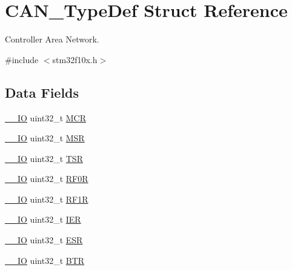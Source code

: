 \hypertarget{struct_c_a_n___type_def}{}\section{C\+A\+N\+\_\+\+Type\+Def Struct Reference}
\label{struct_c_a_n___type_def}


Controller Area Network.  




{\ttfamily \#include $<$stm32f10x.\+h$>$}

\subsection*{Data Fields}
\begin{DoxyCompactItemize}
\item 
\mbox{\hyperlink{core__sc300_8h_aec43007d9998a0a0e01faede4133d6be}{\+\_\+\+\_\+\+IO}} uint32\+\_\+t \mbox{\hyperlink{struct_c_a_n___type_def_a27af4e9f888f0b7b1e8da7e002d98798}{M\+CR}}
\item 
\mbox{\hyperlink{core__sc300_8h_aec43007d9998a0a0e01faede4133d6be}{\+\_\+\+\_\+\+IO}} uint32\+\_\+t \mbox{\hyperlink{struct_c_a_n___type_def_acdd4c1b5466be103fb2bb2a225b1d3a9}{M\+SR}}
\item 
\mbox{\hyperlink{core__sc300_8h_aec43007d9998a0a0e01faede4133d6be}{\+\_\+\+\_\+\+IO}} uint32\+\_\+t \mbox{\hyperlink{struct_c_a_n___type_def_a87e3001757a0cd493785f1f3337dd0e8}{T\+SR}}
\item 
\mbox{\hyperlink{core__sc300_8h_aec43007d9998a0a0e01faede4133d6be}{\+\_\+\+\_\+\+IO}} uint32\+\_\+t \mbox{\hyperlink{struct_c_a_n___type_def_accf4141cee239380d0ad4634ee21dbf6}{R\+F0R}}
\item 
\mbox{\hyperlink{core__sc300_8h_aec43007d9998a0a0e01faede4133d6be}{\+\_\+\+\_\+\+IO}} uint32\+\_\+t \mbox{\hyperlink{struct_c_a_n___type_def_a02b589bb589df4f39e549dca4d5abb08}{R\+F1R}}
\item 
\mbox{\hyperlink{core__sc300_8h_aec43007d9998a0a0e01faede4133d6be}{\+\_\+\+\_\+\+IO}} uint32\+\_\+t \mbox{\hyperlink{struct_c_a_n___type_def_a6566f8cfbd1d8aa7e8db046aa35e77db}{I\+ER}}
\item 
\mbox{\hyperlink{core__sc300_8h_aec43007d9998a0a0e01faede4133d6be}{\+\_\+\+\_\+\+IO}} uint32\+\_\+t \mbox{\hyperlink{struct_c_a_n___type_def_a2b39f943954e0e7d177b511d9074a0b7}{E\+SR}}
\item 
\mbox{\hyperlink{core__sc300_8h_aec43007d9998a0a0e01faede4133d6be}{\+\_\+\+\_\+\+IO}} uint32\+\_\+t \mbox{\hyperlink{struct_c_a_n___type_def_a5c0fcd3e7b4c59ab1dd68f6bd8f74e07}{B\+TR}}

\end{DoxyCompactItemize}
